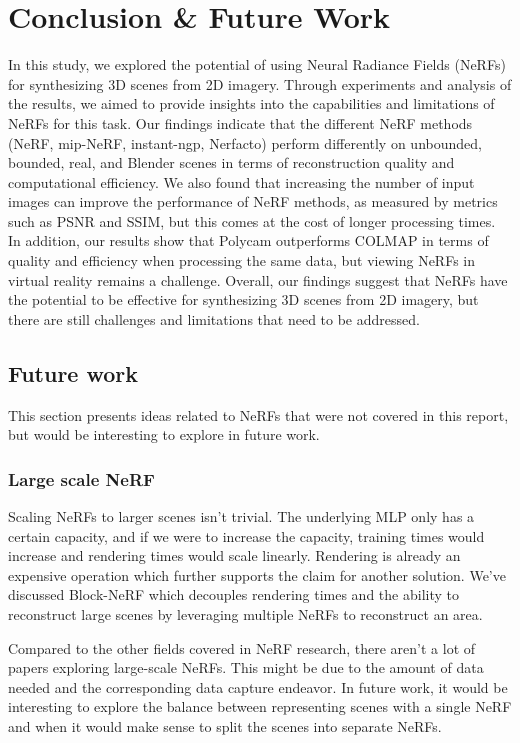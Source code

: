 \chapter{Conclusion \& Future Work}
In this study, we explored the potential of using Neural Radiance Fields (NeRFs) for synthesizing 3D scenes from 2D imagery. Through experiments and analysis of the results, we aimed to provide insights into the capabilities and limitations of NeRFs for this task. Our findings indicate that the different NeRF methods (NeRF, mip-NeRF, instant-ngp, Nerfacto) perform differently on unbounded, bounded, real, and Blender scenes in terms of reconstruction quality and computational efficiency. We also found that increasing the number of input images can improve the performance of NeRF methods, as measured by metrics such as PSNR and SSIM, but this comes at the cost of longer processing times. In addition, our results show that Polycam outperforms COLMAP in terms of quality and efficiency when processing the same data, but viewing NeRFs in virtual reality remains a challenge. Overall, our findings suggest that NeRFs have the potential to be effective for synthesizing 3D scenes from 2D imagery, but there are still challenges and limitations that need to be addressed.

\section{Future work}
This section presents ideas related to NeRFs that were not covered in this report, but would be interesting to explore in future work.

\subsection{Large scale NeRF}
Scaling NeRFs to larger scenes isn't trivial. The underlying MLP only has a certain capacity, and if we were to increase the capacity, training times would increase and rendering times would scale linearly. Rendering is already an expensive operation which further supports the claim for another solution. We've discussed Block-NeRF which decouples rendering times and the ability to reconstruct large scenes by leveraging multiple NeRFs to reconstruct an area.

Compared to the other fields covered in NeRF research, there aren't a lot of papers exploring large-scale NeRFs. This might be due to the amount of data needed and the corresponding data capture endeavor. In future work, it would be interesting to explore the balance between representing scenes with a single NeRF and when it would make sense to split the scenes into separate NeRFs.

